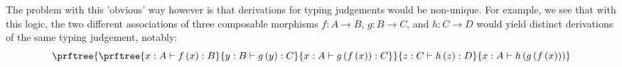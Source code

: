 \documentclass[pra,floatfix,
amsmath,superscriptaddress, 12pt]{article}
\theoremstyle{definition}
\begin{document}

The problem with this 'obvious' way however is that derivations for typing
judgements would be non-unique. For example, we see that with this logic, the two different associations of three composable morphisms $f:A\longrightarrow B$,
$g:B\longrightarrow C$, and $h:C\longrightarrow D$ would yield distinct derivations of the same typing judgement, notably:
\[
\prftree{\prftree{x:A\vdash f\left(x\right):B}{y:B\vdash g\left(y\right):C}{x:A\vdash g\left(f\left(x\right)\right):C}}{z:C\vdash h\left(z\right):D}{x:A\vdash h\left(g\left(f\left(x\right)\right)\right)}
\]
\end{document}

